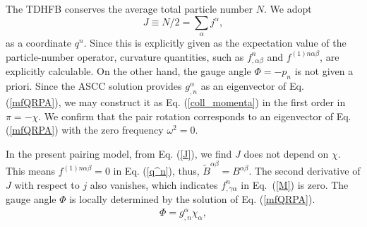\documentclass[%
superscriptaddress,
showpacs,
nofootinbib,
amsmath,amssymb,
aps,
prc,
twocolumn,
floatfix ]%
{revtex4-1}
\begin{document}
The TDHFB conserves the average total particle number $N$.
We adopt 
\begin{equation}
	J\equiv N/2=\sum_\alpha j^\alpha, 
  \label{J}
\end{equation}
as a coordinate $q^n$.
Since this is explicitly given as the expectation value of the particle-number
operator, curvature quantities,
such as $f^n_{,\alpha\beta}$ and $f^{(1)n\alpha\beta}$,
are explicitly calculable.
On the other hand, the gauge angle $\Phi=-p_n$ is not given a priori.
Since the ASCC solution provides $g^\alpha_{,n}$ as an eigenvector of
Eq. (\ref{mfQRPA}),
we may construct it as Eq. (\ref{coll_momenta}) in the first order
in $\pi=-\chi$.
We confirm that the pair rotation corresponds to an eigenvector
of Eq. (\ref{mfQRPA}) with the zero frequency $\omega^2=0$.



In the present pairing model, 
from Eq. (\ref{J}), we find $J$ does not depend on $\chi$.
This means $f^{(1)n\alpha\beta}=0$ in Eq. (\ref{q^n}),
thus, $\tilde{B}^{\alpha\beta}=B^{\alpha\beta}$.
The second derivative of $J$ with respect to $j$ also vanishes,
which indicates $f^n_{,\gamma\alpha}$ in Eq.~(\ref{M}) is zero. 
The gauge angle $\Phi$ is locally determined
by the solution of Eq. (\ref{mfQRPA}).
\begin{align}
\Phi = g^\alpha_{,n} \chi_{\alpha},
  \label{total_gauge}
\end{align}
\end{document}
